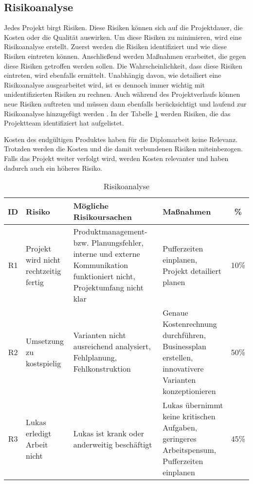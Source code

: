 \subsection{Risikoanalyse}

Jedes Projekt birgt Risiken. Diese Risiken können sich auf die Projektdauer, die Kosten oder die Qualität auswirken. Um diese Risiken zu minimieren, wird eine Risikoanalyse erstellt. Zuerst werden die Risiken identifiziert und wie diese Risiken eintreten können. Anschließend werden Maßnahmen erarbeitet, die gegen diese Risiken getroffen werden sollen. Die Wahrscheinlichkeit, dass diese Risiken eintreten, wird ebenfalls ermittelt. Unabhängig davon, wie detailiert eine Risikoanalyse ausgearbeitet wird, ist es dennoch immer wichtig mit unidentifizierten Risiken zu rechnen. Auch während des Projektverlaufs können neue Risiken auftreten und müssen dann ebenfalls berücksichtigt und laufend zur Risikoanalyse hinzugefügt werden . In der Tabelle \ref{tab:risikoanalyse} werden Risiken, die das Projektteam identifiziert hat aufgelistet.

Kosten des endgültigen Produktes haben für die Diplomarbeit keine Relevanz. Trotzden werden die Kosten und die damit verbundenen Risiken miteinbezogen. Falls das Projekt weiter verfolgt wird, werden Kosten relevanter und haben dadurch auch ein höheres Risiko.

\begin{table}[H]
  {
    \small
    \begin{tabular}{|c|p{}|p{}|p{}|c|}
      \hline
      ID & Risiko                                & Mögliche Risikoursachen                                                                                                & Maßnahmen                                                                                         & \%   \\ \hline
      R1 & Projekt wird nicht rechtzeitig fertig & Produktmanagement- bzw. Planungsfehler, interne und externe Kommunikation funktioniert nicht, Projektumfang nicht klar & Pufferzeiten einplanen, Projekt detailiert planen                                                 & 10\% \\ \hline
      R2 & Umsetzung zu kostspielig              & Varianten nicht ausreichend analysiert, Fehlplanung, Fehlkonstruktion                                                  & Genaue Kostenrechnung durchführen, Businessplan erstellen, innovativere Varianten konzeptionieren & 50\% \\ \hline
      R3 & Lukas erledigt Arbeit nicht           & Lukas ist krank oder anderweitig beschäftigt                                                                           & Lukas übernimmt keine kritischen Aufgaben, geringeres Arbeitspensum, Pufferzeiten einplanen       & 45\% \\ \hline
    \end{tabular}}
  \caption{Risikoanalyse}
  \label{tab:risikoanalyse}
\end{table}
